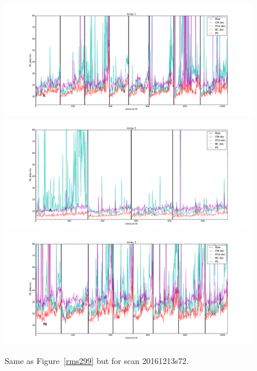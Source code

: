 \begin{figure}[ht] %
\begin{center}
\includegraphics[scale=0.26]{Figures/DarkTests/rms_TOI_array_1_20161213s72.pdf} 
\includegraphics[scale=0.26]{Figures/DarkTests/rms_TOI_array_2_20161213s72.pdf} 
\includegraphics[scale=0.26]{Figures/DarkTests/rms_TOI_array_3_20161213s72.pdf} 
\end{center}
\caption{Same as Figure~\ref{rms299} but for scan 20161213s72. \label{rms72}}
\end{figure}

